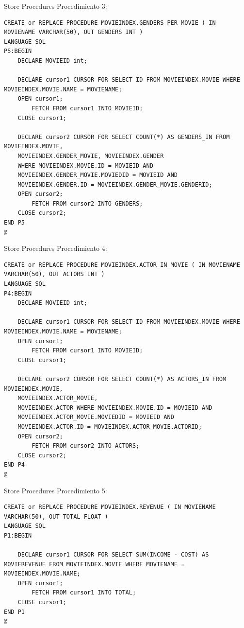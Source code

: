\documentclass{beamer}%
\begin{document}
\begin{frame}[fragile]{Store Procedures}
Procedimiento 3:
\begin{tiny}
\begin{verbatim}
CREATE or REPLACE PROCEDURE MOVIEINDEX.GENDERS_PER_MOVIE ( IN MOVIENAME VARCHAR(50), OUT GENDERS INT )
LANGUAGE SQL
P5:BEGIN
    DECLARE MOVIEID int;

    DECLARE cursor1 CURSOR FOR SELECT ID FROM MOVIEINDEX.MOVIE WHERE MOVIEINDEX.MOVIE.NAME = MOVIENAME;
    OPEN cursor1;
        FETCH FROM cursor1 INTO MOVIEID;
    CLOSE cursor1;

    DECLARE cursor2 CURSOR FOR SELECT COUNT(*) AS GENDERS_IN FROM MOVIEINDEX.MOVIE, 
    MOVIEINDEX.GENDER_MOVIE, MOVIEINDEX.GENDER 
    WHERE MOVIEINDEX.MOVIE.ID = MOVIEID AND 
    MOVIEINDEX.GENDER_MOVIE.MOVIEDID = MOVIEID AND 
    MOVIEINDEX.GENDER.ID = MOVIEINDEX.GENDER_MOVIE.GENDERID;
    OPEN cursor2;
        FETCH FROM cursor2 INTO GENDERS;
    CLOSE cursor2;
END P5
@
\end{verbatim}
\end{tiny}
\end{frame}


\begin{frame}[fragile]{Store Procedures}
Procedimiento 4:
\begin{tiny}
\begin{verbatim}
CREATE or REPLACE PROCEDURE MOVIEINDEX.ACTOR_IN_MOVIE ( IN MOVIENAME VARCHAR(50), OUT ACTORS INT )
LANGUAGE SQL
P4:BEGIN
    DECLARE MOVIEID int;

    DECLARE cursor1 CURSOR FOR SELECT ID FROM MOVIEINDEX.MOVIE WHERE MOVIEINDEX.MOVIE.NAME = MOVIENAME;
    OPEN cursor1;
        FETCH FROM cursor1 INTO MOVIEID;
    CLOSE cursor1;

    DECLARE cursor2 CURSOR FOR SELECT COUNT(*) AS ACTORS_IN FROM MOVIEINDEX.MOVIE, 
    MOVIEINDEX.ACTOR_MOVIE, 
    MOVIEINDEX.ACTOR WHERE MOVIEINDEX.MOVIE.ID = MOVIEID AND 
    MOVIEINDEX.ACTOR_MOVIE.MOVIEDID = MOVIEID AND 
    MOVIEINDEX.ACTOR.ID = MOVIEINDEX.ACTOR_MOVIE.ACTORID;
    OPEN cursor2;
        FETCH FROM cursor2 INTO ACTORS;
    CLOSE cursor2;
END P4
@
\end{verbatim}
\end{tiny}
\end{frame}


\begin{frame}[fragile]{Store Procedures}
Procedimiento 5:
\begin{tiny}
\begin{verbatim}
CREATE or REPLACE PROCEDURE MOVIEINDEX.REVENUE ( IN MOVIENAME VARCHAR(50), OUT TOTAL FLOAT )
LANGUAGE SQL
P1:BEGIN

    DECLARE cursor1 CURSOR FOR SELECT SUM(INCOME - COST) AS MOVIEREVENUE FROM MOVIEINDEX.MOVIE WHERE MOVIENAME = MOVIEINDEX.MOVIE.NAME;
    OPEN cursor1;
        FETCH FROM cursor1 INTO TOTAL;
    CLOSE cursor1;
END P1
@
\end{verbatim}
\end{tiny}
\end{frame}
\end{document}
